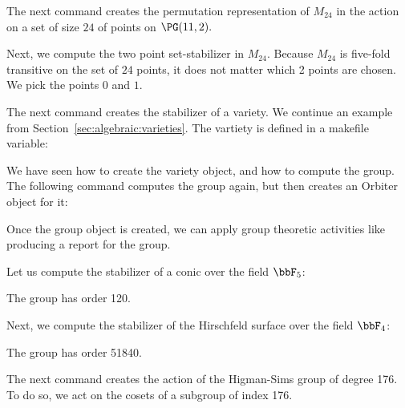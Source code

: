 \bigskip

The next command creates the permutation representation 
of $M_{24}$ in the action on a set of size $24$ of points on $\PG(11,2).$


\bigskip

Next, we compute the two point set-stabilizer in $M_{24}$. Because $M_{24}$ is five-fold transitive
on the set of $24$ points, it does not matter which 2 points are chosen. 
We pick the points $0$ and $1$. 


\bigskip

The next command creates the stabilizer of a variety. 
We continue an example from Section~\ref{sec:algebraic:varieties}. 
The vartiety is defined in a makefile variable:


We have seen how to create the variety object, and how to compute the group. 
The following command computes the group again, but then creates an Orbiter object for it:




Once the group object is created, we can apply group theoretic activities like producing a report for the group.

\bigskip



Let us compute the stabilizer of a conic over the field $\bbF_5$:




The group has order 120.

\bigskip




Next, we compute the stabilizer of the Hirschfeld surface over the field $\bbF_4$:




The group has order 51840.

\bigskip



The next command creates the action of the Higman-Sims group of degree 176. 
To do so, we act on the cosets of a subgroup of index 176.





\bigskip






